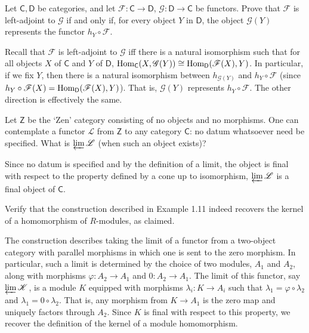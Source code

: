 \documentclass[../../master.tex]{subfiles}
\begin{document}
\begin{problem}
    Let $\mathsf{C}, \mathsf{D}$ be categories, and let $\mathscr{F} : \mathsf{C} \to \mathsf{D}$, $\mathscr{G} : \mathsf{D} \to \mathsf{C}$ be functors.
    Prove that $\mathscr{F}$ is left-adjoint to $\mathscr{G}$ if and only if, for every object $Y$ in $\mathsf{D}$, the object $\mathscr{G}(Y)$ represents the functor $h_Y \circ \mathscr{F}$.
\end{problem}

\begin{solution}
    Recall that $\mathscr{F}$ is left-adjoint to $\mathscr{G}$ iff there is a natural isomorphism such that for all objects $X$ of $\mathsf{C}$ and $Y$ of $\mathsf{D}$, $\operatorname{Hom}_{\mathsf{C}}(X, \mathscr{G}(Y)) \cong \operatorname{Hom}_{\mathsf{D}}(\mathscr{F}(X), Y)$.
    In particular, if we fix $Y$, then there is a natural isomorphism between $h_{\mathscr{G}(Y)}$ and $h_Y \circ \mathscr{F}$ (since $h_Y \circ \mathscr{F}(X) = \operatorname{Hom}_{\mathsf{D}}(\mathscr{F}(X), Y)$).
    That is, $\mathscr{G}(Y)$ represents $h_Y \circ \mathscr{F}$.
    The other direction is effectively the same.
\end{solution}

\begin{problem}
    Let $\mathsf{Z}$ be the `Zen' category consisting of no objects and no morphisms.
    One can contemplate a functor $\mathscr{L}$ from $\mathsf{Z}$ to any category $\mathsf{C}$:
    no datum whatsoever need be specified.
    What is $\varprojlim \mathscr{L}$ (when such an object exists)?
\end{problem}

\begin{solution}
    Since no datum is specified and by the definition of a limit, the object is final with respect to the property defined by a cone up to isomorphism, $\varprojlim \mathscr{L}$ is a final object of $\mathsf{C}$.
\end{solution}

\begin{problem}
    Verify that the construction described in Example 1.11 indeed recovers the kernel of a homomorphism of $R$-modules, as claimed.
\end{problem}

\begin{solution}
    The construction describes taking the limit of a functor from a two-object category with parallel morphisms in which one is sent to the zero morphism.
    In particular, such a limit is determined by the choice of two modules, $A_1$ and $A_2$, along with morphisms $\varphi: A_2 \to A_1$ and $0: A_2 \to A_1$.
    The limit of this functor, say $\varprojlim \mathscr{K}$, is a module $K$ equipped with morphisms $\lambda_i : K \to A_i$ such that $\lambda_1 = \varphi \circ \lambda_2$ and $\lambda_1 = 0 \circ \lambda_2$.
    That is, any morphism from $K \to A_1$ is the zero map and uniquely factors through $A_2$.
    Since $K$ is final with respect to this property, we recover the definition of the kernel of a module homomorphism.
\end{solution}
\end{document}
